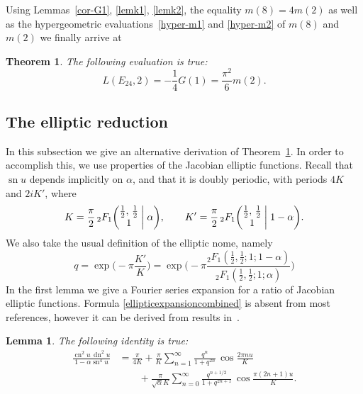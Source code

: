 \documentclass[12pt,reqno]{amsart}
\newtheorem{theorem}{Theorem}
\newtheorem{lemma}{Lemma}
\theoremstyle{remark}
\begin{document}
Using Lemmas~\ref{cor-G1}, \ref{lemk1}, \ref{lemk2},
the equality $m(8)=4m(2)$ as well as the hypergeometric
evaluations~\eqref{hyper-m1} and \eqref{hyper-m2} of $m(8)$ and $m(2)$ we finally arrive at

\begin{theorem}
\label{th-F(2,3)}
The following evaluation is true:
$$
L(E_{24},2)=-\frac14G(1)=\frac{\pi^2}6m(2).
$$
\end{theorem}

\subsection{The elliptic reduction}
In this subsection we give an alternative derivation of
Theorem~\ref{th-F(2,3)}. In order to accomplish this, we use
properties of the Jacobian elliptic functions. Recall that ${\operatorname{sn}} u$
depends implicitly on $\alpha$, and that it is doubly periodic, with
periods $4K$ and $2iK'$, where
\begin{equation*}
K=\frac{\pi}{2}\,{}_2F_1\biggl(\begin{matrix} \frac12, \, \frac12 \\
1 \end{matrix}\biggm| \alpha \biggr),
\qquad
K'=\frac{\pi}{2}\,{}_2F_1\biggl(\begin{matrix} \frac12, \, \frac12 \\
1 \end{matrix}\biggm| 1-\alpha \biggr).
\end{equation*}
We also take the usual definition of the elliptic nome, namely
\begin{equation*}
q=\exp\biggl(-\pi\frac{K'}{K}\biggr)
=\exp\biggl(-\pi\frac{{}_2F_1(\frac{1}{2},\frac{1}{2};1;1-\alpha)}
{{}_2F_1(\frac{1}{2},\frac{1}{2};1;\alpha)}\biggr)
\end{equation*}
In the first lemma we give a Fourier series expansion for a ratio
of Jacobian elliptic functions.  Formula
\eqref{ellipticexpansioncombined} is absent from most references,
however it can be derived from results in~\cite{wanli}.

\begin{lemma}
The following identity is true:
\begin{equation}\label{ellipticexpansioncombined}
\begin{split}
\frac{{\operatorname{cn}}^2u\,{\operatorname{dn}}^2u}{1-\alpha{\operatorname{sn}}^4u}
&=\frac{\pi}{4K}+\frac{\pi}{K}\sum_{n=1}^{\infty}\frac{q^n}{1+q^{2n}}\,\cos\frac{2\pi n u}{K}
\\ &\qquad
+\frac{\pi}{\sqrt{\alpha}K}\sum_{n=0}^{\infty}\frac{q^{n+1/2}}{1+q^{2n+1}}\,\cos\frac{\pi (2n+1)u}{K}.
\end{split}
\end{equation}
\end{lemma}
\end{document}
